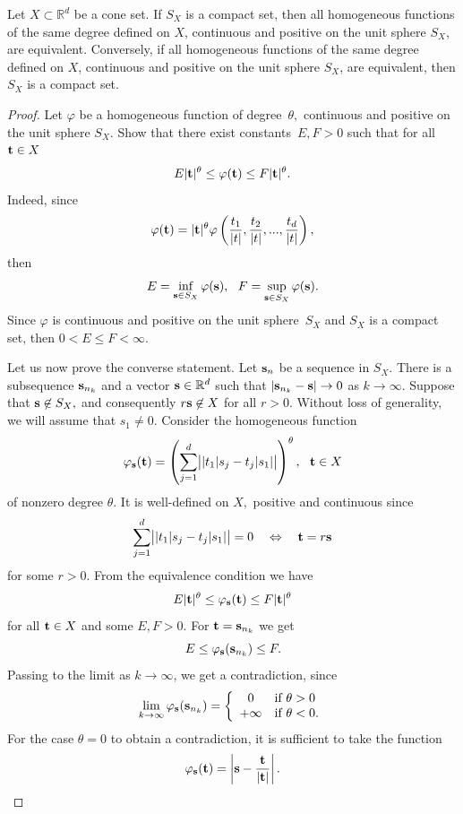 \documentclass[10pt,a4paper]{amsart}
\begin{document}
\begin{proposition}\label{ProposSubHomogeneous}
Let $X\subset\mathbb{R}^d$ be a cone set. If $S_X$ is a compact set, then all homogeneous functions of the same degree defined on $X$, continuous and positive on the unit sphere $S_X$, are equivalent. Conversely, if all homogeneous functions of the same degree defined on $X$, continuous and positive on the unit sphere $S_X$, are equivalent, then $S_X$ is a compact set.
\end{proposition}

\begin{proof}
Let $\varphi$ be a homogeneous function of degree~$\theta,$ continuous and positive on the unit sphere $S_X$. Show that there exist constants~${E,F>0}$ such that for all ${{\bf t}\in X}$
$$
E|{\bf t}|^{\theta}\leq\varphi({\bf t})\leq F|{\bf t}|^{\theta}.
$$
Indeed, since
$$
\varphi({\bf t})=|{\bf t}|^\theta\varphi\left(\frac{t_1}{|t|},\frac{t_2}{|t|},...,\frac{t_d}{|t|}\right),
$$
then
$$
E=\inf\limits_{{\bf s}\in S_X}\varphi({\bf s}),\ \ F=\sup\limits_{{\bf s}\in S_X}\varphi({\bf s}).
$$
Since $\varphi$ is continuous and positive on the unit sphere~$S_X$ and $S_X$ is a compact set, then ${0<E\leq F<\infty}.$

Let us now prove the converse statement. Let ${\bf s}_n$ be a sequence in $S_X.$ There is a subsequence ${\bf s}_{n_k}$ and a vector ${\bf s}\in\mathbb{R}^d$ such that ${|{\bf s}_{n_k}-{\bf s}|\to0}$ as ${k\to\infty}.$ Suppose that ${{\bf s}\not\in S_X},$ and consequently ${r{\bf s}\not\in X}$ for all $r>0.$ 
Without loss of generality, we will assume that ${s_1\neq0}.$
Consider the homogeneous function
$$
\varphi_{\bf s}({\bf t})=\left(\sum_{j=1}^d\bigl||t_1|s_j-t_j|s_1|\bigr|\right)^\theta,\ \ {\bf t}\in X
$$
of nonzero degree $\theta.$ It is well-defined on $X,$ positive and continuous since 
$$
\sum_{j=1}^d\bigl||t_1|s_j-t_j|s_1|\bigr|=0\ \ \ \Leftrightarrow\ \ \ {\bf t}=r{\bf s}
$$
for some $r>0.$
From the equivalence condition we have 
$$
E|{\bf t}|^{\theta}\leq\varphi_{\bf s}({\bf t})\leq F|{\bf t}|^{\theta}
$$
for all ${\bf t}\in X$ and some $E,F>0.$ For ${\bf t}={\bf s}_{n_k}$ we get
$$
E\leq\varphi_{\bf s}({\bf s}_{n_k})\leq F.
$$
Passing to the limit as $k\to\infty$, we get a contradiction, since
$$
\lim_{k\to\infty}\varphi_{\bf s}({\bf s}_{n_k})=
\left\{\begin{array}{cl}
0& \text{if}\ \theta>0\\
+\infty& \text{if}\ \theta<0.
\end{array}\right.
$$
For the case ${\theta=0}$ to obtain a contradiction, it is sufficient to take the function
$$
\varphi_{\bf s}(\bf t)=\left|{\bf s}-\frac{\bf t}{|\bf t|}\right|.
$$
\end{proof}
\end{document}
